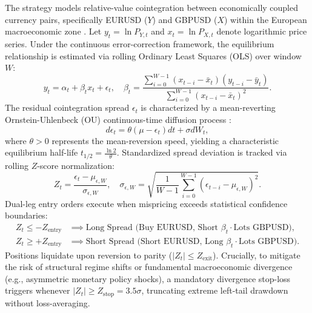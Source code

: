 \documentclass[11pt,a4paper]{article}
\begin{document}
The strategy models relative-value cointegration between economically coupled currency pairs, specifically EURUSD ($Y$) and GBPUSD ($X$) within the European macroeconomic zone \cite{engle1987cointegration, gatev2006pairs}.
Let $y_t = \ln P_{Y, t}$ and $x_t = \ln P_{X, t}$ denote logarithmic price series. Under the continuous error-correction framework, the equilibrium relationship is estimated via rolling Ordinary Least Squares (OLS) over window $W$:
\begin{equation}
y_t = \alpha_t + \beta_t x_t + \epsilon_t, \quad \beta_t = \frac{\sum_{i=0}^{W-1} (x_{t-i} - \bar{x}_t)(y_{t-i} - \bar{y}_t)}{\sum_{i=0}^{W-1} (x_{t-i} - \bar{x}_t)^2}.
\end{equation}
The residual cointegration spread $\epsilon_t$ is characterized by a mean-reverting Ornstein-Uhlenbeck (OU) continuous-time diffusion process \cite{avellaneda2010statistical, vidyamurthy2004pairs}:
\begin{equation}
d\epsilon_t = \theta (\mu - \epsilon_t)dt + \sigma dW_t,
\end{equation}
where $\theta > 0$ represents the mean-reversion speed, yielding a characteristic equilibrium half-life $t_{1/2} = \frac{\ln 2}{\theta}$.
Standardized spread deviation is tracked via rolling $Z$-score normalization:
\begin{equation}
Z_t = \frac{\epsilon_t - \mu_{\epsilon, W}}{\sigma_{\epsilon, W}}, \quad \sigma_{\epsilon, W} = \sqrt{\frac{1}{W-1}\sum_{i=0}^{W-1}(\epsilon_{t-i} - \mu_{\epsilon, W})^2}.
\end{equation}
Dual-leg entry orders execute when mispricing exceeds statistical confidence boundaries:
\begin{align}
Z_t \le -Z_{\text{entry}} & \implies \text{Long Spread (Buy EURUSD, Short } \beta_t \cdot \text{Lots GBPUSD)}, \\
Z_t \ge +Z_{\text{entry}} & \implies \text{Short Spread (Short EURUSD, Long } \beta_t \cdot \text{Lots GBPUSD)}.
\end{align}
Positions liquidate upon reversion to parity ($|Z_t| \le Z_{\text{exit}}$). Crucially, to mitigate the risk of structural regime shifts or fundamental macroeconomic divergence (e.g., asymmetric monetary policy shocks), a mandatory divergence stop-loss triggers whenever $|Z_t| \ge Z_{\text{stop}} = 3.5\sigma$, truncating extreme left-tail drawdown without loss-averaging.
\end{document}
